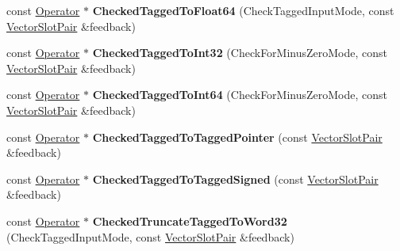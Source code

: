 \begin{DoxyCompactItemize}
const \mbox{\hyperlink{classv8_1_1internal_1_1compiler_1_1Operator}{Operator}} $\ast$ {\bfseries Checked\+Tagged\+To\+Float64} (Check\+Tagged\+Input\+Mode, const \mbox{\hyperlink{classv8_1_1internal_1_1VectorSlotPair}{Vector\+Slot\+Pair}} \&feedback)
\item 
\mbox{\label{classv8_1_1internal_1_1compiler_1_1SimplifiedOperatorBuilder_abb21ad508ad8125e4cc08c9bbe143783}} 
const \mbox{\hyperlink{classv8_1_1internal_1_1compiler_1_1Operator}{Operator}} $\ast$ {\bfseries Checked\+Tagged\+To\+Int32} (Check\+For\+Minus\+Zero\+Mode, const \mbox{\hyperlink{classv8_1_1internal_1_1VectorSlotPair}{Vector\+Slot\+Pair}} \&feedback)
\item 
\mbox{\label{classv8_1_1internal_1_1compiler_1_1SimplifiedOperatorBuilder_a7ab4530943b028574475650d972aa74b}} 
const \mbox{\hyperlink{classv8_1_1internal_1_1compiler_1_1Operator}{Operator}} $\ast$ {\bfseries Checked\+Tagged\+To\+Int64} (Check\+For\+Minus\+Zero\+Mode, const \mbox{\hyperlink{classv8_1_1internal_1_1VectorSlotPair}{Vector\+Slot\+Pair}} \&feedback)
\item 
\mbox{\label{classv8_1_1internal_1_1compiler_1_1SimplifiedOperatorBuilder_ab1cbd91dfd78b7c5d21327edb241d566}} 
const \mbox{\hyperlink{classv8_1_1internal_1_1compiler_1_1Operator}{Operator}} $\ast$ {\bfseries Checked\+Tagged\+To\+Tagged\+Pointer} (const \mbox{\hyperlink{classv8_1_1internal_1_1VectorSlotPair}{Vector\+Slot\+Pair}} \&feedback)
\item 
\mbox{\label{classv8_1_1internal_1_1compiler_1_1SimplifiedOperatorBuilder_a42bb01a049b53c42ade7a4ce07e1f2ee}} 
const \mbox{\hyperlink{classv8_1_1internal_1_1compiler_1_1Operator}{Operator}} $\ast$ {\bfseries Checked\+Tagged\+To\+Tagged\+Signed} (const \mbox{\hyperlink{classv8_1_1internal_1_1VectorSlotPair}{Vector\+Slot\+Pair}} \&feedback)
\item 
\mbox{\label{classv8_1_1internal_1_1compiler_1_1SimplifiedOperatorBuilder_ac29470b7c77c7f34e49146544dea0fd9}} 
const \mbox{\hyperlink{classv8_1_1internal_1_1compiler_1_1Operator}{Operator}} $\ast$ {\bfseries Checked\+Truncate\+Tagged\+To\+Word32} (Check\+Tagged\+Input\+Mode, const \mbox{\hyperlink{classv8_1_1internal_1_1VectorSlotPair}{Vector\+Slot\+Pair}} \&feedback)

\end{DoxyCompactItemize}
